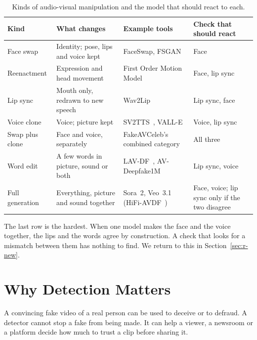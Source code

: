 \begin{table}[ht]
    \centering
    \small
    \caption{Kinds of audio-visual manipulation and the model that should react to each.}
    \label{tab:manipulations}
    \begin{tabularx}{\textwidth}{@{}l>{\raggedright\arraybackslash}X>{\raggedright\arraybackslash}X>{\raggedright\arraybackslash}X@{}}
        \toprule
        \textbf{Kind} & \textbf{What changes} & \textbf{Example tools} & \textbf{Check that should react} \\
        \midrule
        Face swap & Identity; pose, lips and voice kept & FaceSwap, FSGAN~\cite{fsgan} & Face \\
        Reenactment & Expression and head movement & First Order Motion Model~\cite{fomm} & Face, lip sync \\
        Lip sync & Mouth only, redrawn to new speech & Wav2Lip~\cite{wav2lip} & Lip sync, face \\
        Voice clone & Voice; picture kept & SV2TTS~\cite{sv2tts}, VALL-E~\cite{valle} & Voice, lip sync \\
        Swap plus clone & Face and voice, separately & FakeAVCeleb's combined category~\cite{fakeavceleb} & All three \\
        Word edit & A few words in picture, sound or both & LAV-DF~\cite{lavdf}, AV-Deepfake1M~\cite{avdeepfake1m} & Lip sync, voice \\
        Full generation & Everything, picture and sound together & Sora~2, Veo~3.1 (HiFi-AVDF~\cite{havic}) & Face, voice; lip sync only if the two disagree \\
        \bottomrule
    \end{tabularx}
\end{table}

The last row is the hardest. When one model makes the face and the voice
together, the lips and the words agree by construction. A check that looks for
a mismatch between them has nothing to find. We return to this in
Section~\ref{sec:r-new}.

\section{Why Detection Matters}

A convincing fake video of a real person can be used to deceive or to
defraud. A detector cannot stop a fake from being made. It can help a viewer,
a newsroom or a platform decide how much to trust a clip before sharing it.

